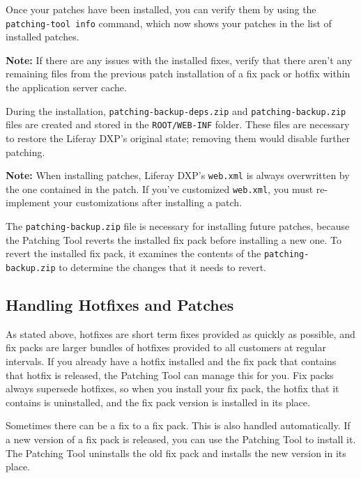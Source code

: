 Once your patches have been installed, you can verify them by using the
\texttt{patching-tool\ info} command, which now shows your patches in
the list of installed patches.

\noindent\hrulefill

\textbf{Note:} If there are any issues with the installed fixes, verify
that there aren't any remaining files from the previous patch
installation of a fix pack or hotfix within the application server
cache.

\noindent\hrulefill

During the installation, \texttt{patching-backup-deps.zip} and
\texttt{patching-backup.zip} files are created and stored in the
\texttt{ROOT/WEB-INF} folder. These files are necessary to restore the
Liferay DXP's original state; removing them would disable further
patching.

\noindent\hrulefill

\textbf{Note:} When installing patches, Liferay DXP's \texttt{web.xml}
is always overwritten by the one contained in the patch. If you've
customized \texttt{web.xml}, you must re-implement your customizations
after installing a patch.

\noindent\hrulefill

The \texttt{patching-backup.zip} file is necessary for installing future
patches, because the Patching Tool reverts the installed fix pack before
installing a new one. To revert the installed fix pack, it examines the
contents of the \texttt{patching-backup.zip} to determine the changes
that it needs to revert.

\subsection{Handling Hotfixes and
Patches}\label{handling-hotfixes-and-patches}

As stated above, hotfixes are short term fixes provided as quickly as
possible, and fix packs are larger bundles of hotfixes provided to all
customers at regular intervals. If you already have a hotfix installed
and the fix pack that contains that hotfix is released, the Patching
Tool can manage this for you. Fix packs always supersede hotfixes, so
when you install your fix pack, the hotfix that it contains is
uninstalled, and the fix pack version is installed in its place.

Sometimes there can be a fix to a fix pack. This is also handled
automatically. If a new version of a fix pack is released, you can use
the Patching Tool to install it. The Patching Tool uninstalls the old
fix pack and installs the new version in its place.

